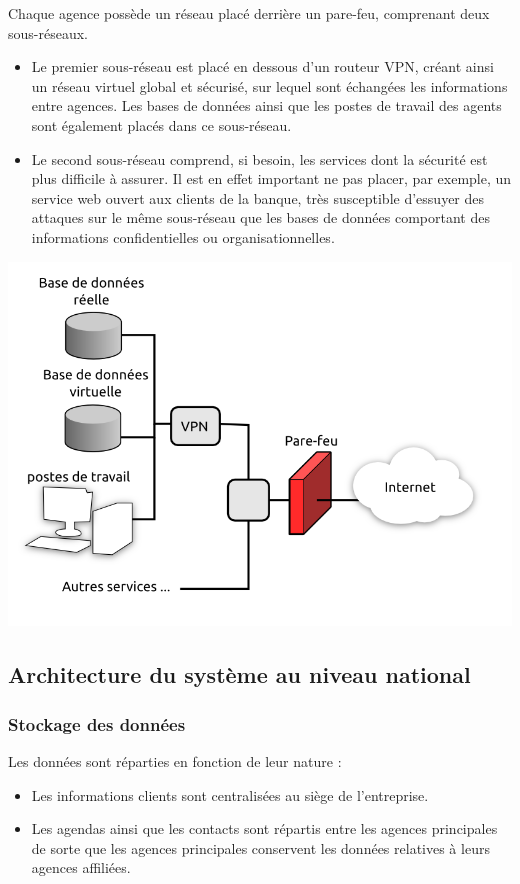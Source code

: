 \documentclass[a4paper]{article}
\begin{document}
Chaque agence possède un réseau placé derrière un pare-feu, comprenant deux sous-réseaux.
\begin{itemize}
  \item Le premier sous-réseau est placé en dessous d'un routeur VPN, créant ainsi un réseau virtuel global et sécurisé, sur lequel sont échangées les informations entre agences. Les bases de données ainsi que les postes de travail des agents sont également placés dans ce sous-réseau.
  \item Le second sous-réseau comprend, si besoin, les services dont la sécurité est plus difficile à assurer. Il est en effet important ne pas placer, par exemple, un service web ouvert aux clients de la banque, très susceptible d'essuyer des attaques sur le même sous-réseau que les bases de données comportant des informations confidentielles ou organisationnelles. 
\end{itemize}

\includegraphics[width=\linewidth]{Includes/archi_agence.png}


\subsection{Architecture du système au niveau national}
\subsubsection{ Stockage des données }

Les données sont réparties en fonction de leur nature :
\begin{itemize}
  \item Les informations clients sont centralisées au siège de l'entreprise.
  \item Les agendas ainsi que les contacts sont répartis entre les agences principales de sorte que les agences principales conservent les données relatives à leurs agences affiliées.
\end{itemize}
  
\end{document}

